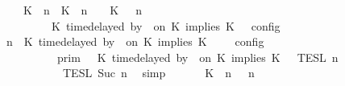 \begin{isabellebody}
\ \ \ \ {\isasymunion}\ {\isasymlbrakk}\ {\isacharparenleft}{\isacharparenleft}K\ {\isasymUp}\ n{\isacharparenright}\ {\isacharhash}\ {\isacharparenleft}K\ {\isacharat}\ n\ {\isasymoplus}\ {\isasymdelta}{\isasymtau}\ {\isasymRightarrow}\ K\ {\isacharhash}\ {\isasymGamma}{\isacharparenright}{\isacharcomma}\ n\isanewline
\ \ \ \ \ \ \ \ {\isasymturnstile}\ {\isasymPsi}\ {\isasymtriangleright}\ {\isacharparenleft}{\isacharparenleft}K\ time{\isacharminus}delayed\ by\ {\isasymdelta}{\isasymtau}\ on\ K\ implies\ K\ {\isacharhash}\ {\isasymPhi}{\isacharparenright}\ {\isasymrbrakk}\isactrlsub c\isactrlsub o\isactrlsub n\isactrlsub f\isactrlsub i\isactrlsub g{\isacartoucheclose}\isanewline
%
\isadelimproof
%
\endisadelimproof
%
\isatagproof
{}\isamarkupfalse%
\ {\isacharminus}\isanewline
\ \ \isamarkupfalse%
\ {}{\isacharcolon}{\isacartoucheopen}{\isasymlbrakk}\ {\isasymGamma}{\isacharcomma}\ n\ {\isasymturnstile}\ {\isacharparenleft}K\ time{\isacharminus}delayed\ by\ {\isasymdelta}{\isasymtau}\ on\ K\ implies\ K\ {\isacharhash}\ {\isasymPsi}\ {\isasymtriangleright}\ {\isasymPhi}\ {\isasymrbrakk}\isactrlsub c\isactrlsub o\isactrlsub n\isactrlsub f\isactrlsub i\isactrlsub g\isanewline
\ \ \ \ \ \ \ \ \ {\isacharequal}\ {\isasymlbrakk}{\isasymlbrakk}\ {\isasymGamma}\ {\isasymrbrakk}{\isasymrbrakk}\isactrlsub p\isactrlsub r\isactrlsub i\isactrlsub m\ {\isasyminter}\ {\isasymlbrakk}{\isasymlbrakk}\ {\isacharparenleft}K\ time{\isacharminus}delayed\ by\ {\isasymdelta}{\isasymtau}\ on\ K\ implies\ K\ {\isacharhash}\ {\isasymPsi}\ {\isasymrbrakk}{\isasymrbrakk}\isactrlsub T\isactrlsub E\isactrlsub S\isactrlsub L\isactrlbsup {\isasymge}\ n\isactrlesup \isanewline
\ \ \ \ \ \ \ \ \ \ {\isasyminter}\ {\isasymlbrakk}{\isasymlbrakk}\ {\isasymPhi}\ {\isasymrbrakk}{\isasymrbrakk}\isactrlsub T\isactrlsub E\isactrlsub S\isactrlsub L\isactrlbsup {\isasymge}\ Suc\ n\isactrlesup {\isacartoucheclose}\ \isamarkupfalse%
\ simp\isanewline
\ \ \isamarkupfalse%
\ \isamarkupfalse%
\ {\isacartoucheopen}{\isasymlbrakk}\ {\isacharparenleft}{\isacharparenleft}K\ {\isasymnot}{\isasymUp}\ n{\isacharparenright}\ {\isacharhash}\ {\isasymGamma}{\isacharparenright}{\isacharcomma}\ n\isanewline

\end{isabellebody}
